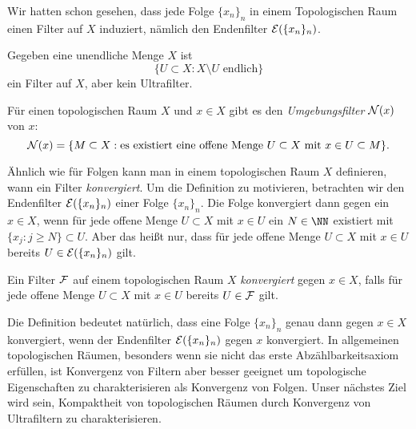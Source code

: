 Wir hatten schon gesehen, dass jede Folge $\{x_n\}_n$ in einem Topologischen Raum einen Filter auf $X$ induziert, nämlich den Endenfilter $\cal E(\{x_n\}_n)$.

Gegeben eine unendliche Menge $X$ ist
\[
  \{U\subset X : \text{$X\setminus U$ endlich}\}
\]
ein Filter auf $X$, aber kein Ultrafilter.

Für einen topologischen Raum $X$ und $x\in X$ gibt es den \emph{Umgebungsfilter} $\cal N(x)$ von $x$:
\[
  \cal N(x) = \{M\subset X : \text{es existiert eine offene Menge $U\subset X$ mit $x\in U\subset M$}\}.
\]

Ähnlich wie für Folgen kann man in einem topologischen Raum $X$ definieren, wann ein Filter \emph{konvergiert}. Um die Definition zu motivieren, betrachten wir den Endenfilter $\cal E(\{x_n\}_n)$ einer Folge $\{x_n\}_n$. Die Folge konvergiert dann gegen ein $x\in X$, wenn für jede offene Menge $U\subset X$ mit $x\in U$ ein $N\in\NN$ existiert mit $\{x_j : j\geq N\}\subset U$. Aber das heißt nur, dass für jede offene Menge $U\subset X$ mit $x\in U$ bereits $U\in \cal E(\{x_n\}_n)$ gilt.
\begin{definition}
  Ein Filter $\cal F$ auf einem topologischen Raum $X$ \emph{konvergiert} gegen $x\in X$, falls für jede offene Menge $U\subset X$ mit $x\in U$ bereits $U\in\cal F$ gilt.
\end{definition}
Die Definition bedeutet natürlich, dass eine Folge $\{x_n\}_n$ genau dann gegen $x\in X$ konvergiert, wenn der Endenfilter $\cal E(\{x_n\}_n)$ gegen $x$ konvergiert. In allgemeinen topologischen Räumen, besonders wenn sie nicht das erste Abzählbarkeitsaxiom erfüllen, ist Konvergenz von Filtern aber besser geeignet um topologische Eigenschaften zu charakterisieren als Konvergenz von Folgen. Unser nächstes Ziel wird sein, Kompaktheit von topologischen Räumen durch Konvergenz von Ultrafiltern zu charakterisieren.

